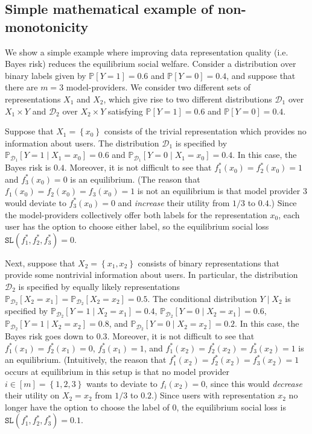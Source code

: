\documentclass[letterpaper,11pt]{article}
\theoremstyle{plain}
\begin{document}
\subsection{Simple mathematical example of non-monotonicity}\label{subsec:example}

We show a simple example where improving data representation quality (i.e. Bayes risk) reduces the equilibrium social welfare. Consider a distribution over binary labels given by $\mathbb{P}[Y = 1] = 0.6$ and $\mathbb{P}[Y = 0] = 0.4$, and suppose that there are $m = 3$ model-providers. We consider two different sets of representations $X_1$ and $X_2$, which give rise to two different distributions $\mathcal{D}_1$ over $X_1 \times Y$ and $\mathcal{D}_2$ over $X_2 \times Y$ satisfying  $\mathbb{P}[Y = 1] = 0.6$ and $\mathbb{P}[Y = 0] = 0.4$. 

Suppose that $X_1 = \left\{x_0 \right\}$ consists of the trivial representation which provides no information about users. The distribution $\mathcal{D}_1$ is specified by $\mathbb{P}_{\mathcal{D}_1}[Y = 1 \mid X_1 = x_0] = 0.6$ and $\mathbb{P}_{\mathcal{D}_1}[Y = 0 \mid X_1 = x_0] = 0.4$. In this case, the Bayes risk is $0.4$. Moreover,  
it is not difficult to see that $f^*_1(x_0) = f^*_2(x_0) = 1$ and $f^*_3(x_0) = 0$ is an equilibrium. (The reason that $f_1(x_0) = f_2(x_0) = f_3(x_0) = 1$ is not an equilibrium is that model provider 3 would deviate to $f^*_3(x_0) = 0$ and 
\textit{increase} their utility from $1/3$ to $0.4$.) Since the model-providers collectively offer both labels for the representation $x_0$, each user has the option to choose either label, so the equilibrium social loss $\texttt{SL}(f^*_1, f^*_2, f^*_3) = 0$. 

Next, suppose that $X_2 = \left\{x_1,x_2\right\}$ consists of binary representations that provide some nontrivial information about users.
In particular, the distribution $\mathcal{D}_2$ is specified by equally likely representations $\mathbb{P}_{\mathcal{D}_2}[X_2 = x_1] = \mathbb{P}_{\mathcal{D}_2}[X_2 = x_2] = 0.5$. The conditional distribution $Y \mid X_2$ is specified by $\mathbb{P}_{\mathcal{D}_2}[Y = 1 \mid X_2 = x_1] = 0.4$, $\mathbb{P}_{\mathcal{D}_2}[Y = 0 \mid X_2 = x_1] = 0.6$, $\mathbb{P}_{\mathcal{D}_2}[Y = 1 \mid X_2 = x_2] = 0.8$, and $\mathbb{P}_{\mathcal{D}_2}[Y = 0 \mid X_2 = x_2] = 0.2$. In this case, the Bayes risk goes down to $0.3$. Moreover, it is not difficult to see that $f^*_1(x_1) = f^*_2(x_1) = 0$,  $f^*_3(x_1) = 1$, and $f^*_1(x_2) = f^*_2(x_2) = f^*_3(x_2) = 1$ is an equilibrium. (Intuitively, the reason that $f^*_1(x_2) = f^*_2(x_2) = f^*_3(x_2) = 1$ occurs at equilibrium in this setup is that no model provider $i \in [m] = \left\{1, 2, 3\right\}$ wants to deviate to $f_i(x_2) = 0$, since this would \textit{decrease} their utility on $X_2 = x_2$ from $1/3$ to $0.2$.) Since users with representation $x_2$ no longer have the option to choose the label of $0$, the equilibrium social loss is $\texttt{SL}(f^*_1, f^*_2, f^*_3) = 0.1$.
\end{document}
